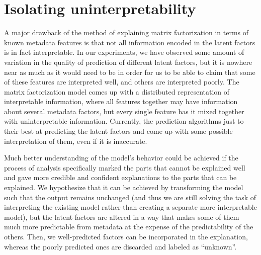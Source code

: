 \section{Isolating uninterpretability}

A major drawback of the method of explaining matrix factorization in terms of
known metadata features is that not all information encoded in the latent
factors is in fact interpretable. In our experiments, we have observed some
amount of variation in the quality of prediction of different latent factors,
but it is nowhere near as much as it would need to be in order for us to be able
to claim that some of these features are interpreted well, and others are
interpreted poorly. The matrix factorization model comes up with a distributed
representation of interpretable information, where all features together may
have information about several metadata factors, but every single feature has it
mixed together with uninterpretable information. Currently, the prediction
algorithms just to their best at predicting the latent factors and come up with
some possible interpretation of them, even if it is inaccurate.

Much better understanding of the model's behavior could be achieved if the
process of analysis specifically marked the parts that cannot be explained well
and gave more credible and confident explanations to the parts that can be
explained. We hypothesize that it can be achieved by transforming the model such
that the output remains unchanged (and thus we are still solving the task of
interpreting the existing model rather than creating a separate more
interpretable model), but the latent factors are altered in a way that makes
some of them much more predictable from metadata at the expense of the
predictability of the others. Then, we well-predicted factors can be
incorporated in the explanation, whereas the poorly predicted ones are discarded
and labeled as ``unknown''.

